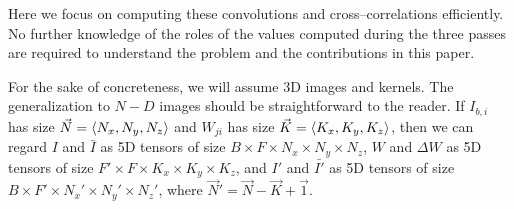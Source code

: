   Here we focus on computing these convolutions and
  cross--correlations efficiently.  No further knowledge of the roles
  of the values computed during the three passes are required to
  understand the problem and the contributions in this paper.



  For the sake of concreteness, we will assume 3D images and
  kernels. The generalization to $N-D$ images should be
  straightforward to the reader.
  If $I_{b,i}$ has size $\vec{N} = \langle N_x, N_y, N_z\rangle$ and
  $W_{ji}$ has size $\vec{K} = \langle K_x,K_y,K_z\rangle$, then we can
  regard $I$ and $\bar{I}$ as 5D tensors of size $B \times F \times N_x
  \times N_y \times N_z$, $W$ and $\Delta W$ as 5D tensors of size $F'
  \times F \times K_x \times K_y \times K_z$, and $I'$ and $\bar{I'}$ as
  5D tensors of size $B \times F' \times N_x' \times N_y' \times N_z'$,
  where $\vec{N}' = \vec{N} - \vec{K} + \vec{1}$.
